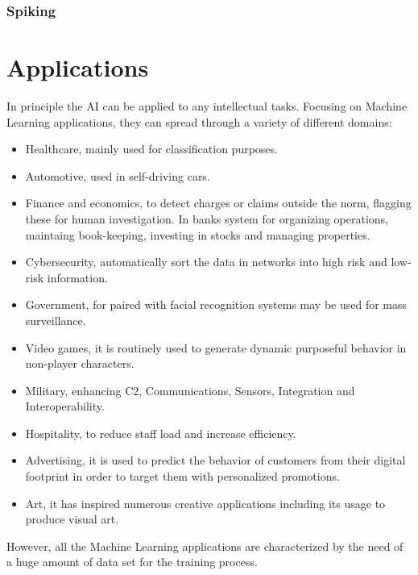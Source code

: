 \subsubsection{Spiking}

\section{Applications}
In principle the AI can be applied to any intellectual tasks. Focusing on Machine Learning applications, they can spread through a variety of different domains:
\begin{itemize}
\item Healthcare, mainly used for classification purposes.
\item Automotive, used in self-driving cars.
\item Finance and economics, to detect charges or claims outside the norm, flagging these for human investigation. In banks system for organizing operations, maintaing book-keeping, investing in stocks and managing properties.
\item Cybersecurity, automatically sort the data in networks into high risk and low-risk information.
\item Government, for paired with facial recognition systems may be used for mass surveillance.
\item Video games, it is routinely used to generate dynamic purposeful behavior in non-player characters.
\item Military, enhancing C2, Communications, Sensors, Integration and Interoperability.
\item Hospitality, to reduce staff load and increase efficiency.
\item Advertising, it is used to predict the behavior of customers from their digital footprint in order to target them with personalized promotions.
\item Art, it has inspired numerous creative applications including its usage to produce visual art.
\end{itemize}
However, all the Machine Learning applications are characterized by the need of a huge amount of data set for the training process.